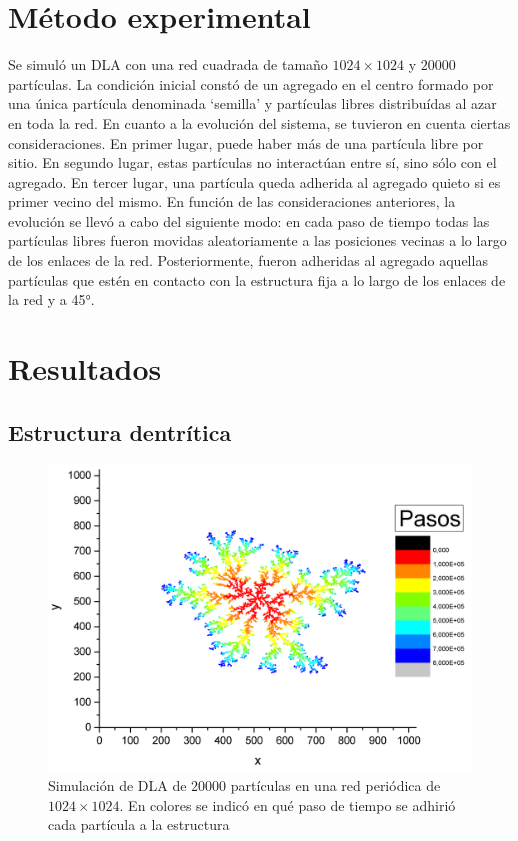 \documentclass[aps,prb,twocolumn,superscriptaddress,floatfix,longbibliography]{revtex4-2}
\begin{document}
\section{Método experimental}

Se simuló un DLA con una red cuadrada de tamaño $1024 \times 1024$ y $20000$ partículas. La condición inicial constó de un agregado en el centro formado por una única partícula denominada `semilla' y partículas libres distribuídas al azar en toda la red. En cuanto a la evolución del sistema, se tuvieron en cuenta ciertas consideraciones. En primer lugar, puede haber más de una partícula libre por sitio. En segundo lugar, estas partículas no interactúan entre sí, sino sólo con el agregado. En tercer lugar, una partícula queda adherida al agregado quieto si es primer vecino del mismo. En función de las consideraciones anteriores, la evolución se llevó a cabo del siguiente modo: en cada paso de tiempo todas las partículas libres fueron movidas aleatoriamente a las posiciones vecinas a lo largo de los enlaces de la red. Posteriormente, fueron adheridas al agregado aquellas partículas que estén en contacto con la estructura fija a lo largo de los enlaces de la red y a 45°.

\section{Resultados}

\subsection{Estructura dentrítica}

\begin{figure}[h]
    \includegraphics[clip=true,width=\columnwidth]{dendritas.png}
    \caption{Simulación de DLA de $20000$ partículas en una red periódica de $1024 \times 1024$. En colores se indicó en qué paso de tiempo se adhirió cada partícula a la estructura}
     \label{fig:dendritas}
\end{figure}
\end{document}
